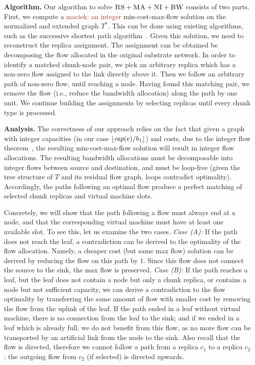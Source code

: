 \documentclass[9pt]{sigcomm-alternate}
\newcommand{\maciek}[1]{\textcolor{brown}{maciek: #1}}
\newcommand{\achunk}{\ensuremath{c}}
\newcommand{\capacity}{\emph{cap}}
\newcommand{\CC}{\textsc{NI}}
\newcommand{\RS}{\textsc{RS}}
\newcommand{\BW}{\textsc{BW}}
\newcommand{\MA}{\textsc{MA}}
\newcommand{\Tree}{\ensuremath{T}}
\newcommand{\CostTrans}{\ensuremath{b_1}}
\begin{document}
\textbf{Algorithm.}
Our algorithm to solve $\RS+\MA+\CC+\BW$ consists of two parts. 
First, we compute a \maciek{an integer} min-cost-max-flow solution on the normalized and extended graph $\Tree^*$. 
This can be done using existing algorithms, such as the successive shortest path algorithm~\cite{successive_shortest_path_complexity}.
Given this solution, we need to reconstruct the replica assignment. 
The assignment can be obtained be decomposing the flow allocated in the
original substrate network. In order to identify a matched chunk-node pair, we 
pick an arbitrary replica which has a non-zero flow assigned to the link directly above it. 
Then we follow an arbitrary path of non-zero flow, until reaching a node.
Having found this matching pair, we remove the flow (i.e., reduce the bandwidth allocation)
along the path by one unit. 
We continue building the assignments by selecting replicas until every chunk type is processed.

\textbf{Analysis.}
The correctness of our approach relies on the fact that
given a graph with integer capacities (in our case $\lfloor\capacity(e)/\CostTrans\rfloor$)
and costs, due to the integer flow theorem~\cite{successive_shortest_path_complexity},
the resulting min-cost-max-flow solution will result in integer flow allocations. The resulting
bandwidth allocations must be decomposable into integer flows between source and destination,
and must be loop-free (given the tree structure of $\Tree$ and its residual flow graph, loops contradict optimality). 
Accordingly, the paths following an optimal flow produce a perfect matching of selected chunk replicas and virtual machine slots.

Concretely, we will show that the path following a flow must always end at a node, and that the
corresponding virtual machine must have at least one available slot.
To see this, let us examine the two cases.
\emph{Case (A):} If the path does not reach the leaf, a contradiction can be derived to the optimality of
the flow allocation. Namely, a cheaper cost (but same max flow) solution can be derived by reducing the flow on this path by $1$.
Since this flow does not connect the source to the sink, the max flow is preserved. 
\emph{Case (B):} If the 
path reaches a leaf, but the leaf does not contain a node but only a chunk replica, or
 contains a node but not sufficient capacity, 
 we can derive a contradiction to the flow optimality by transferring the same amount of flow with smaller cost by removing 
 the flow from the uplink of the leaf. 
 If the path ended in a leaf without virtual machine, there is no connection from the leaf to the sink; 
 and if we ended in a leaf which is already full, we do not benefit from this flow, 
 as no more flow can be transported by an artificial link from the node to the 
 sink. 
 Also recall that the flow is directed, therefore we cannot follow a path 
 from a replica $\achunk_1$ to a replica $\achunk_2$: the 
 outgoing flow from $\achunk_2$ (if selected) is directed upwards.
\end{document}
